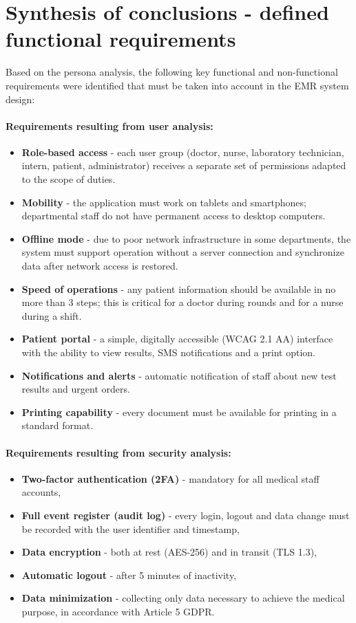\section{Synthesis of conclusions - defined functional requirements}

Based on the persona analysis, the following key functional and non-functional requirements were identified that must be taken into account in the EMR system design:

\paragraph{Requirements resulting from user analysis:}
\begin{itemize}
    \item \textbf{Role-based access} - each user group (doctor, nurse, laboratory technician, intern, patient, administrator) receives a separate set of permissions adapted to the scope of duties.
    \item \textbf{Mobility} - the application must work on tablets and smartphones; departmental staff do not have permanent access to desktop computers.
    \item \textbf{Offline mode} - due to poor network infrastructure in some departments, the system must support operation without a server connection and synchronize data after network access is restored.
    \item \textbf{Speed of operations} - any patient information should be available in no more than 3 steps; this is critical for a doctor during rounds and for a nurse during a shift.
    \item \textbf{Patient portal} - a simple, digitally accessible (WCAG 2.1 AA) interface with the ability to view results, SMS notifications and a print option.
    \item \textbf{Notifications and alerts} - automatic notification of staff about new test results and urgent orders.
    \item \textbf{Printing capability} - every document must be available for printing in a standard format.
\end{itemize}

\paragraph{Requirements resulting from security analysis:}
\begin{itemize}
    \item \textbf{Two-factor authentication (2FA)} - mandatory for all medical staff accounts,
    \item \textbf{Full event register (audit log)} - every login, logout and data change must be recorded with the user identifier and timestamp,
    \item \textbf{Data encryption} - both at rest (AES-256) and in transit (TLS 1.3),
    \item \textbf{Automatic logout} - after 5 minutes of inactivity,
    \item \textbf{Data minimization} - collecting only data necessary to achieve the medical purpose, in accordance with Article 5 GDPR.
\end{itemize}

